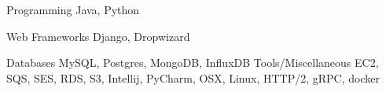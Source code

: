 

\begin{cvskills}

  \cvskill
    {Programming} %
    {Java, Python} %

  \cvskill
    {Web Frameworks} %
    {Django, Dropwizard} %

  \cvskill
    {Databases} %
    {MySQL, Postgres, MongoDB, InfluxDB} %
  \cvskill
    {Tools/Miscellaneous} %
    {EC2, SQS, SES, RDS, S3, Intellij, PyCharm, OSX, Linux, HTTP/2, gRPC, docker} %

\end{cvskills}
